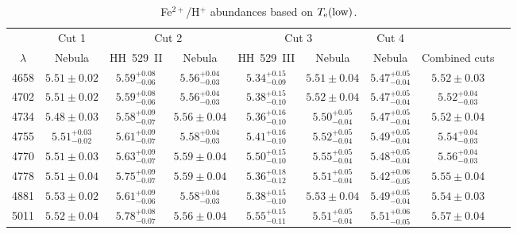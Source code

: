 \documentclass[fleqn,usenatbib]{mnras}
\begin{document}
\begin{table*}
\centering
\caption{Fe$^{2+}$/H$^{+}$ abundances based on $T_{\rm e} (\text{low})$.}
\label{tab:Fe3_abundances_low}
\begin{tabular}{ccccccccc}
\hline
 & \multicolumn{1}{c}{Cut 1} & \multicolumn{2}{c}{Cut 2} & \multicolumn{2}{c}{Cut 3} & \multicolumn{1}{c}{Cut 4} \\
$\lambda$ &  Nebula & HH~529~II &  Nebula & HH~529~III &  Nebula &  Nebula & Combined cuts\\
\hline

4658  & $5.51 \pm 0.02$ & $5.59^{+0.08} _{-0.06}$ & $5.56^{+0.04} _{-0.03}$ & $5.34^{+0.15} _{-0.09}$ & $5.51 \pm 0.04$ & $5.47^{+0.05} _{-0.04}$ & $5.52 \pm 0.03$ \\

4702 & $5.51 \pm 0.02$ & $5.59^{+0.08} _{-0.06}$ & $5.56^{+0.04} _{-0.03}$ &  $5.38^{+0.15} _{-0.10}$  & $5.52 \pm 0.04$ & $5.47^{+0.05} _{-0.04}$ & $5.52^{+0.04} _{-0.03}$ \\

4734 & $5.48 \pm 0.03$ & $5.58^{+0.09} _{-0.07}$ & $5.56 \pm 0.04$  &  $5.36^{+0.16} _{-0.10}$  & $5.50^{+0.05} _{-0.04}$ & $5.47^{+0.05} _{-0.04}$ & $5.52 \pm 0.04$ \\

4755 & $5.51^{+0.03} _{-0.02}$ & $5.61^{+0.09} _{-0.07}$ & $5.58^{+0.04} _{-0.03}$ &  $5.41^{+0.16} _{-0.10}$  & $5.52^{+0.05} _{-0.04}$ & $5.49^{+0.05} _{-0.04}$ & $5.54^{+0.04} _{-0.03}$ \\

4770 & $5.51 \pm 0.03$ &$5.63^{+0.09} _{-0.07}$ & $5.59 \pm 0.04$ &  $5.50^{+0.15} _{-0.10}$ & $5.55^{+0.05} _{-0.04}$ & $5.48^{+0.05} _{-0.04}$ &  $5.56^{+0.04} _{-0.03}$ \\

4778 & $5.51 \pm 0.04$ &$5.75^{+0.09} _{-0.07}$& $5.59 \pm 0.04$ &  $5.36^{+0.18} _{-0.12}$  & $5.51^{+0.05} _{-0.04}$ & $5.42^{+0.06} _{-0.05}$ & $5.55 \pm 0.04$ \\

4881 & $5.53 \pm 0.02$ &$5.61^{+0.09} _{-0.06}$& $5.58^{+0.04} _{-0.03}$ & $5.38^{+0.15} _{-0.10}$   & $5.53 \pm 0.04$ & $5.49^{+0.05} _{-0.04}$ & $5.54 \pm 0.03$ \\

5011 & $5.52 \pm 0.04$ &$5.78^{+0.08} _{-0.07}$& $5.56 \pm 0.04$  & $5.55^{+0.15} _{-0.11}$  & $5.51^{+0.05} _{-0.04}$ & $5.51^{+0.06} _{-0.05}$ &  $5.57 \pm 0.04$\\


\end{tabular}
\end{table*}
\end{document}
